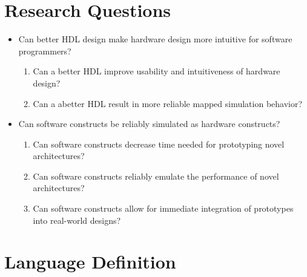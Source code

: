 \documentclass[10pt]{article}
\begin{document}
\section{Research Questions}

\begin{itemize}
	\item Can better HDL design make hardware design more intuitive for software programmers?
	      \begin{enumerate}
		      \item Can a better HDL improve usability and intuitiveness of hardware design?
		      \item Can a abetter HDL result in more reliable mapped simulation behavior?
	      \end{enumerate}
	\item Can software constructs be reliably simulated as hardware constructs?
	      \begin{enumerate}
		      \item Can software constructs decrease time needed for prototyping novel architectures?
		      \item Can software constructs reliably emulate the performance of novel architectures?
		      \item Can software constructs allow for immediate integration of prototypes into real-world designs?
	      \end{enumerate}
\end{itemize}


\section{Language Definition}

\setlength{\abovedisplayskip}{2pt}
\setlength{\belowdisplayskip}{2pt}
\end{document}
